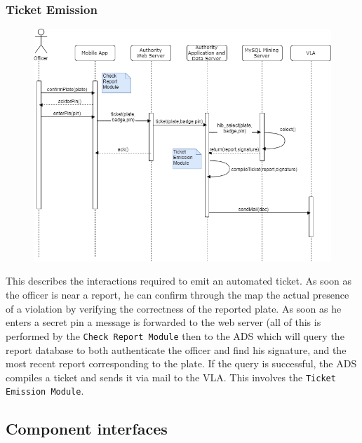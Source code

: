 \documentclass[12pt,a4paper]{article}
\begin{document}
\subsubsection{Ticket Emission}
\begin{figure}[H]
\begin{adjustwidth}{-25mm}{-25mm}
				\centering				
					        \includegraphics[width=0.75\paperwidth]{Images/automated_ticket}
\end{adjustwidth}
\end{figure}
This describes the interactions required to emit an automated ticket. As soon as the officer is near a report, he can confirm through the map the actual presence of a violation by verifying the correctness of the reported plate. As soon as he enters a secret pin a message is forwarded to the web server (all of this is performed by the \texttt{Check Report Module} then to the ADS which will query the report database to both authenticate the officer and find his signature, and the most recent report corresponding to the plate. If the query is successful, the ADS compiles a ticket and sends it via mail to the VLA. This involves the \texttt{Ticket Emission Module}.
\subsection{Component interfaces}
\end{document}
